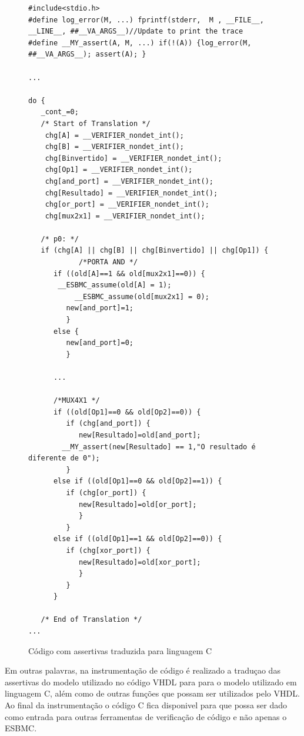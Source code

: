 \begin{figure}[htp]
\caption{\label{fig:assert_c} Código com assertivas traduzida para linguagem C}
	\begin{center}
    \begin{minipage}{0.99\textwidth}
    \begin{lstlisting}       
#include<stdio.h>
#define log_error(M, ...) fprintf(stderr,  M , __FILE__, __LINE__, ##__VA_ARGS__)//Update to print the trace
#define __MY_assert(A, M, ...) if(!(A)) {log_error(M, ##__VA_ARGS__); assert(A); }

...

do {
   _cont_=0;
   /* Start of Translation */
    chg[A] = __VERIFIER_nondet_int(); 
    chg[B] = __VERIFIER_nondet_int(); 
    chg[Binvertido] = __VERIFIER_nondet_int(); 
    chg[Op1] = __VERIFIER_nondet_int();
    chg[and_port] = __VERIFIER_nondet_int();
    chg[Resultado] = __VERIFIER_nondet_int();
    chg[or_port] = __VERIFIER_nondet_int();
    chg[mux2x1] = __VERIFIER_nondet_int();

   /* p0: */
   if (chg[A] || chg[B] || chg[Binvertido] || chg[Op1]) {
            /*PORTA AND */
      if ((old[A]==1 && old[mux2x1]==0)) {
	   __ESBMC_assume(old[A] = 1);
           __ESBMC_assume(old[mux2x1] = 0);
         new[and_port]=1;
         }
      else {
         new[and_port]=0;
         }

      ...

      /*MUX4X1 */
      if ((old[Op1]==0 && old[Op2]==0)) {
         if (chg[and_port]) {
            new[Resultado]=old[and_port];
	    __MY_assert(new[Resultado] == 1,"O resultado é diferente de 0");
         }
      else if ((old[Op1]==0 && old[Op2]==1)) {
         if (chg[or_port]) {
            new[Resultado]=old[or_port];
            }
         }
      else if ((old[Op1]==1 && old[Op2]==0)) {
         if (chg[xor_port]) {
            new[Resultado]=old[xor_port];
            }
         }
      }

   /* End of Translation */
...
    \end{lstlisting}
    \end{minipage}
	\end{center}
\end{figure}

\par
Em outras palavras, na instrumentação de código é realizado a traduçao das assertivas do modelo utilizado no código VHDL para para o modelo utilizado em linguagem C, além como de outras funções que possam ser utilizados pelo VHDL. Ao final da instrumentação o código C fica disponivel para que possa ser dado como entrada para outras ferramentas de verificação de código e não apenas o ESBMC.

